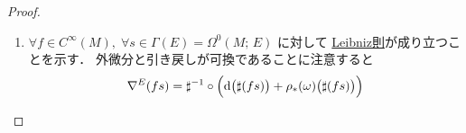\documentclass[geometry_main]{subfiles}
\begin{document}
\begin{proof}
\begin{enumerate}
        \item 
        $\forall f \in C^\infty(M),\; \forall s \in \Gamma(E) = \Omega^0(M;\, E)$ に対して
        \hyperref[def:connection-vect]{Leibniz則}が成り立つことを示す．
        外微分と引き戻しが可換であることに注意すると
        \begin{align}
            \nabla^E (fs)
            &= \sharp^{-1} \circ \Bigl( \dd\bigl(\sharp (fs)\bigr) + \rho_* (\omega) \bigl( \sharp(fs) \bigr)   \Bigr) \\

\end{align}
\end{enumerate}
\end{proof}
\end{document}
